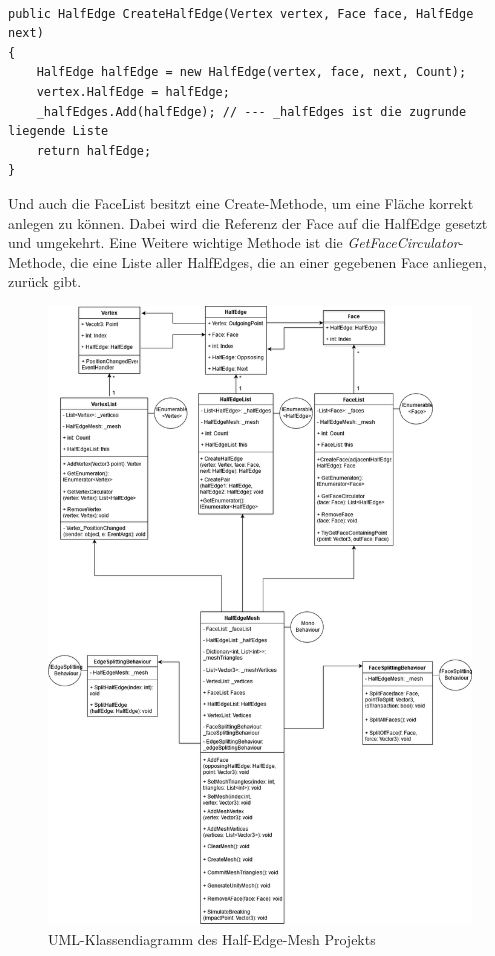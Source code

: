 \begin{lstlisting}

public HalfEdge CreateHalfEdge(Vertex vertex, Face face, HalfEdge next)
{
	HalfEdge halfEdge = new HalfEdge(vertex, face, next, Count);
	vertex.HalfEdge = halfEdge;
	_halfEdges.Add(halfEdge); // --- _halfEdges ist die zugrunde liegende Liste
	return halfEdge;
}

\end{lstlisting}

Und auch die FaceList besitzt eine Create-Methode, um eine Fl\"ache korrekt anlegen zu k\"onnen. Dabei wird die Referenz der Face auf die HalfEdge gesetzt und umgekehrt. Eine Weitere wichtige Methode ist die \textit{GetFaceCirculator}-Methode, die eine Liste aller HalfEdges, die an einer gegebenen Face anliegen, zur\"uck gibt.

\begin{figure}[t]
	\centering
	\includegraphics[width=0.7\linewidth]{Images/ClassDiagramHalfEdgeMesh}
	\caption[HalfEdgeMeshUMLDiagramm]{UML-Klassendiagramm des Half-Edge-Mesh Projekts}
	\label{fig:classdiagramhalfedgemesh}
\end{figure}


